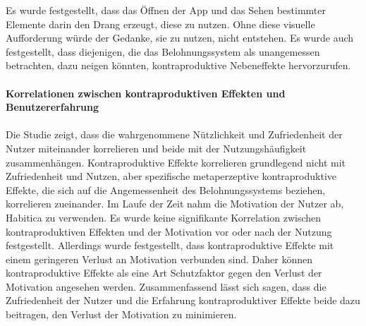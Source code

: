 \documentclass[sigconf, nonacm]{acmart}
\begin{document}
Es wurde festgestellt, dass das Öffnen der App und das Sehen bestimmter Elemente darin den Drang erzeugt, diese zu nutzen. Ohne diese visuelle Aufforderung würde der Gedanke, sie zu nutzen, nicht entstehen. Es wurde auch festgestellt, dass diejenigen, die das Belohnungssystem als unangemessen betrachten, dazu neigen könnten, kontraproduktive Nebeneffekte hervorzurufen.
\\
\\
\textbf{Korrelationen zwischen kontraproduktiven Effekten und Benutzererfahrung}
\\
\\
Die Studie zeigt, dass die wahrgenommene Nützlichkeit und Zufriedenheit der Nutzer miteinander korrelieren und beide mit der Nutzungshäufigkeit zusammenhängen. Kontraproduktive Effekte korrelieren grundlegend nicht mit Zufriedenheit und Nutzen, aber spezifische metaperzeptive kontraproduktive Effekte, die sich auf die Angemessenheit des Belohnungssystems beziehen, korrelieren zueinander. Im Laufe der Zeit nahm die Motivation der Nutzer ab, Habitica zu verwenden. Es wurde keine signifikante Korrelation zwischen kontraproduktiven Effekten und der Motivation vor oder nach der Nutzung festgestellt. Allerdings wurde festgestellt, dass kontraproduktive Effekte mit einem geringeren Verlust an Motivation verbunden sind. Daher können kontraproduktive Effekte als eine Art Schutzfaktor gegen den Verlust der Motivation angesehen werden. Zusammenfassend lässt sich sagen, dass die Zufriedenheit der Nutzer und die Erfahrung kontraproduktiver Effekte beide dazu beitragen, den Verlust der Motivation zu minimieren.
\end{document}
